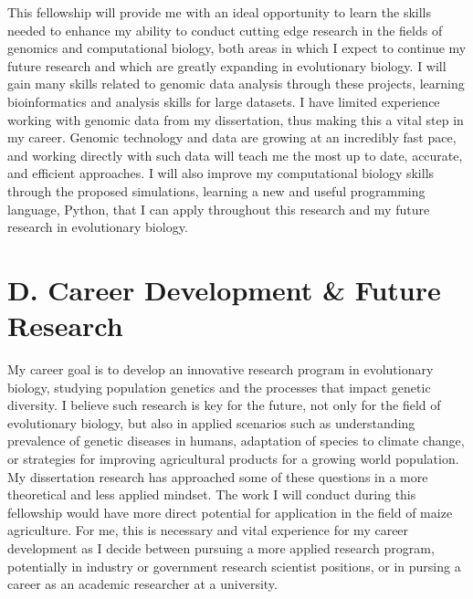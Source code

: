 This fellowship will provide me with an ideal opportunity to learn the skills needed to enhance my ability to conduct cutting edge research in the fields of genomics and computational biology, both areas in which I expect to continue my future research and which are greatly expanding in evolutionary biology. I will gain many skills related to genomic data analysis through these projects, learning bioinformatics and analysis skills for large datasets. I have limited experience working with genomic data from my dissertation, thus making this a vital step in my career. Genomic technology and data are growing at an incredibly fast pace, and working directly with such data will teach me the most up to date, accurate, and efficient approaches. I will also improve my computational biology skills through the proposed simulations, learning a new and useful programming language, Python, that I can apply throughout this research and my future research in evolutionary biology. 


\section*{D. Career Development \& Future Research}

My career goal is to develop an innovative research program in evolutionary biology, studying population genetics and the processes that impact genetic diversity. I believe such research is key for the future, not only for the field of evolutionary biology, but also in applied scenarios such as understanding prevalence of genetic diseases in humans, adaptation of species to climate change, or strategies for improving agricultural products for a growing world population. My dissertation research has approached some of these questions in a more theoretical and less applied mindset. The work I will conduct during this fellowship would have more direct potential for application in the field of maize agriculture. For me, this is necessary and vital experience for my career development as I decide between pursuing a more applied research program, potentially in industry or government research scientist positions, or in pursing a career as an academic researcher at a university.

